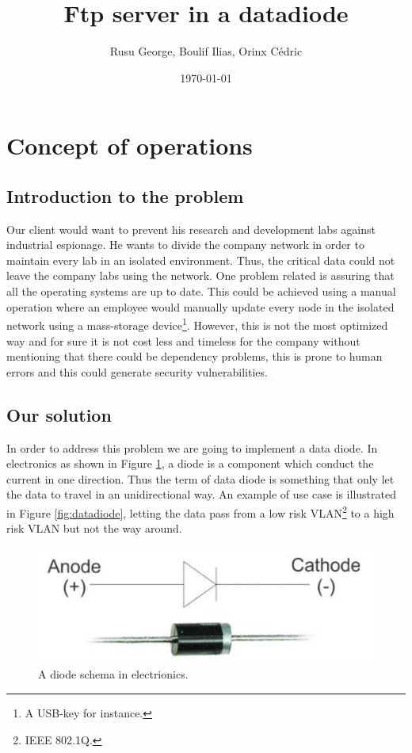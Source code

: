 \documentclass[a4paper,10pt]{article}
\title{Ftp server in a datadiode}
\author{Rusu George, Boulif Ilias, Orinx Cédric}
\date{\today}
\begin{document}
\maketitle
\newpage
\tableofcontents
\newpage
\section{Concept of operations}
\subsection{Introduction to the problem}
Our client would want to prevent his research and development labs against industrial espionage. He wants to divide the company network in order to maintain every lab in an isolated environment. Thus, the critical data could not leave the company labs using the network. One problem related is assuring that all the operating systems are up to date. This could be achieved using a manual operation where an employee would manually update every node in the isolated network using a mass-storage device\footnote{A USB-key for instance.}. However, this is not the most optimized way and for sure it is not cost less and timeless for the company without mentioning that there could be dependency problems, this is prone to human errors and this could generate security vulnerabilities.

\subsection{Our solution}
In order to address this problem we are going to implement a data diode. In electronics as shown in Figure \ref{fig:diode}, a diode is a component which conduct the current in one direction. Thus the term of data diode is something that only let the data to travel in an unidirectional way. An example of use case is illustrated in Figure \ref{fig:datadiode}, letting the data pass from a low risk VLAN\footnote{IEEE 802.1Q.} to a high risk VLAN but not the way around.
\begin{figure}
\centering
\includegraphics[scale=0.25]{images/diode.png}
\caption{A diode schema in electrionics.}
\label{fig:diode}
\end{figure}
\end{document}
